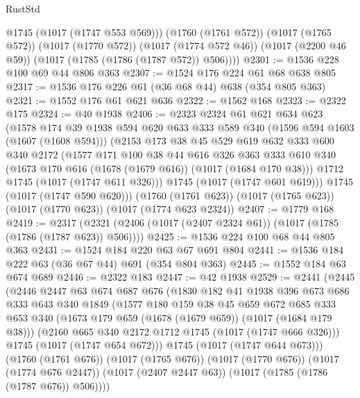 \begin{lexlean}{RustStd}
\begin{coremodule}
          @1745
          (@1017 (@1747 @553 @569)))
        (@1760 (@1761 @572))
        (@1017 (@1765 @572))
        (@1017 (@1770 @572))
        (@1017 (@1774 @572 @46))
        (@1017 (@2200 @46 @59))
        (@1017 (@1785 (@1786 (@1787 @572)) @506))))
@2301 := @1536 @228 @100 @69 @44 @806 @363
@2307 := @1524 @176 @224 @61 @68 @638 @805
@2317 := @1536 @176 @226 @61 (@36 @68 @44) @638 (@354 @805 @363)
@2321 := @1552 @176 @61 @621 @636
@2322 := @1562 @168
@2323 := @2322 @175
@2324 := @40 @1938
@2406 := @2323
    @2324
    @61
    @621
    @634
    @623
    (@1578
      @174
      @39
      @1938
      @594
      @620
      @633
      @333
      @589
      @340
      (@1596 @594 @1603 (@1607 (@1608 @594)))
      (@2153
        @173
        @38
        @45
        @529
        @619
        @632
        @333
        @600
        @340
        @2172
        (@1577
          @171
          @100
          @38
          @44
          @616
          @326
          @363
          @333
          @610
          @340
          (@1673 @170 @616 (@1678 (@1679 @616)) (@1017 (@1684 @170 @38)))
          @1712
          @1745
          (@1017 (@1747 @611 @326)))
        @1745
        (@1017 (@1747 @601 @619)))
      @1745
      (@1017 (@1747 @590 @620)))
    (@1760 (@1761 @623))
    (@1017 (@1765 @623))
    (@1017 (@1770 @623))
    (@1017 (@1774 @623 @2324))
@2407 := @1779 @168
@2419 := @2317 (@2321 (@2406 (@1017 (@2407 @2324 @61)) (@1017 (@1785 (@1786 (@1787 @623)) @506))))
@2425 := @1536 @224 @100 @68 @44 @805 @363
@2431 := @1524 @184 @220 @63 @67 @691 @804
@2441 := @1536 @184 @222 @63 (@36 @67 @44) @691 (@354 @804 @363)
@2445 := @1552 @184 @63 @674 @689
@2446 := @2322 @183
@2447 := @42 @1938
@2529 := @2441
    (@2445
      (@2446
        @2447
        @63
        @674
        @687
        @676
        (@1830
          @182
          @41
          @1938
          @396
          @673
          @686
          @333
          @643
          @340
          @1849
          (@1577
            @180
            @159
            @38
            @45
            @659
            @672
            @685
            @333
            @653
            @340
            (@1673 @179 @659 (@1678 (@1679 @659)) (@1017 (@1684 @179 @38)))
            (@2160 @665 @340 @2172 @1712 @1745 (@1017 (@1747 @666 @326)))
            @1745
            (@1017 (@1747 @654 @672)))
          @1745
          (@1017 (@1747 @644 @673)))
        (@1760 (@1761 @676))
        (@1017 (@1765 @676))
        (@1017 (@1770 @676))
        (@1017 (@1774 @676 @2447))
        (@1017 (@2407 @2447 @63))
        (@1017 (@1785 (@1786 (@1787 @676)) @506))))

\end{coremodule}
\end{lexlean}
